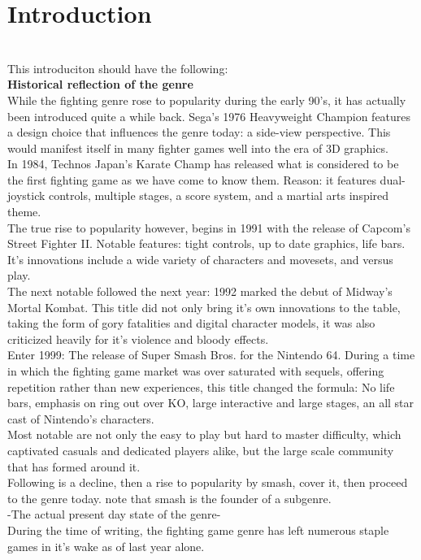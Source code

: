 \documentclass{article}
\begin{document}
\chapter{Introduction}\\
This introduciton should have the following:\\
\textbf{Historical reflection of the genre} \cite{jeffdunn2012:1}\\
While the fighting genre rose to popularity during the early 90's, it has actually been introduced quite a while back. Sega's 1976 Heavyweight Champion features a design choice that influences the genre today: a side-view perspective. This would manifest itself in many fighter games well into the era of 3D graphics.\\
In 1984, Technos Japan's Karate Champ has released what is considered to be the first fighting game as we have come to know them. Reason: it features dual-joystick controls, multiple stages, a score system, and a martial arts inspired theme.\\
The true rise to popularity however, begins in 1991 with the release of Capcom's Street Fighter II. Notable features: tight controls, up to date graphics, life bars. It's innovations include a wide variety of characters and movesets, and versus play.\\
The next notable followed the next year: 1992 marked the debut of Midway's Mortal Kombat. This title did not only bring it's own innovations to the table, taking the form of gory fatalities and digital character models, it was also criticized heavily for it's violence and bloody effects.\\
Enter 1999: The release of Super Smash Bros. for the Nintendo 64. During a time in which the fighting game market was over saturated with sequels, offering repetition rather than new experiences, this title changed the formula: No life bars, emphasis on ring out over KO, large interactive and large stages, an all star cast of Nintendo's characters.\\
Most notable are not only the easy to play but hard to master difficulty, which captivated casuals and dedicated players alike, but the large scale community that has formed around it.\\
Following is a decline, then a rise to popularity by smash, cover it, then proceed to the genre today. note that smash is the founder of a subgenre.\\
-The actual present day state of the genre-\\
During the time of writing, the fighting game genre has left numerous staple games in it's wake as of last year alone.\cite{eltonjones2017:8}\\
\end{document}
